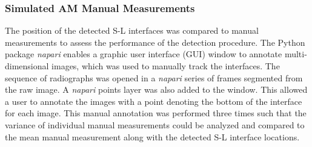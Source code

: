 \subsubsection{Simulated AM Manual Measurements}
The position of the detected S-L interfaces was compared to manual
measurements to assess the performance of the detection procedure.
The Python package \textit{napari} enables a graphic user interface (GUI)
window to annotate multi-dimensional images, which was used to manually
track the interfaces. The sequence of radiographs was opened in a
\textit{napari} series of frames segmented from the raw image.
A \textit{napari} points layer was also added to the window. This allowed a
user to annotate the images with a point denoting the bottom of the interface
for each image. This manual annotation was performed three times such that
the variance of individual manual measurements could be analyzed and
compared to the mean manual measurement along with the detected S-L
interface locations.

